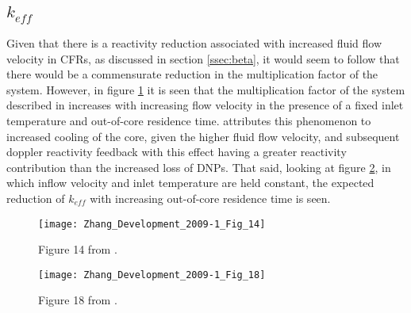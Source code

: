 \documentclass[review]{elsarticle}
\begin{document}
\subsection{$k_{eff}$} \label{ssec:keff}
Given that there is a reactivity reduction associated with increased fluid flow
velocity in CFRs, as discussed in section \ref{ssec:beta}, it would seem to follow
that there would be a commensurate reduction in the multiplication factor of
the system. However, in figure \ref{fig:zhang_velocity_keff} it is seen that the
multiplication factor of the system described in \cite{zhang_development_2009-1}
increases with increasing flow velocity in the presence of a fixed inlet temperature and out-of-core
residence time. \cite{zhang_development_2009-1} attributes
this phenomenon to increased cooling of the core, given the higher fluid flow 
velocity, and subsequent doppler reactivity feedback with this effect
having a greater reactivity contribution than the increased loss of DNPs. That
said, looking at figure \ref{fig:zhang_residence_time_keff}, in which inflow
 velocity and inlet temperature are held constant, the expected reduction of
 $k_{eff}$ with increasing out-of-core residence time is seen.


\begin{figure}[h]
   \centering
   \texttt{[image: Zhang\_Development\_2009-1\_Fig\_14]}
   \caption{Figure 14 from \cite{zhang_development_2009-1}.}
   \label{fig:zhang_velocity_keff}
\end{figure}

\begin{figure}[h]
   \centering
   \texttt{[image: Zhang\_Development\_2009-1\_Fig\_18]}
   \caption{Figure 18 from \cite{zhang_development_2009-1}.} 
   \label{fig:zhang_residence_time_keff}
\end{figure}
\end{document}
